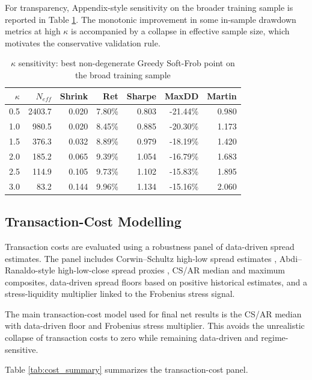 \documentclass[11pt]{article}
\begin{document}
For transparency, Appendix-style sensitivity on the broader training sample is reported in Table \ref{tab:kappa_sensitivity}. The monotonic improvement in some in-sample drawdown metrics at high $\kappa$ is accompanied by a collapse in effective sample size, which motivates the conservative validation rule.

\begin{table}[h!]
\centering
\caption{$\kappa$ sensitivity: best non-degenerate Greedy Soft-Frob point on the broad training sample}
\label{tab:kappa_sensitivity}
\begin{tabular}{rrrrrrr}
\toprule
$\kappa$ & $N_{eff}$ & Shrink & Ret & Sharpe & MaxDD & Martin \\
\midrule
0.5 & 2403.7 & 0.020 & 7.80\% & 0.803 & -21.44\% & 0.980 \\
1.0 & 980.5 & 0.020 & 8.45\% & 0.885 & -20.30\% & 1.173 \\
1.5 & 376.3 & 0.032 & 8.89\% & 0.979 & -18.19\% & 1.420 \\
2.0 & 185.2 & 0.065 & 9.39\% & 1.054 & -16.79\% & 1.683 \\
2.5 & 114.9 & 0.105 & 9.73\% & 1.102 & -15.83\% & 1.895 \\
3.0 & 83.2 & 0.144 & 9.96\% & 1.134 & -15.16\% & 2.060 \\
\bottomrule
\end{tabular}
\end{table}

\subsection{Transaction-Cost Modelling}

Transaction costs are evaluated using a robustness panel of data-driven spread estimates. The panel includes Corwin--Schultz high-low spread estimates \citep{corwinschultz2012}, Abdi--Ranaldo-style high-low-close spread proxies \citep{abdiranaldo2017}, CS/AR median and maximum composites, data-driven spread floors based on positive historical estimates, and a stress-liquidity multiplier linked to the Frobenius stress signal.

The main transaction-cost model used for final net results is the CS/AR median with data-driven floor and Frobenius stress multiplier. This avoids the unrealistic collapse of transaction costs to zero while remaining data-driven and regime-sensitive.

Table \ref{tab:cost_summary} summarizes the transaction-cost panel.
\end{document}
